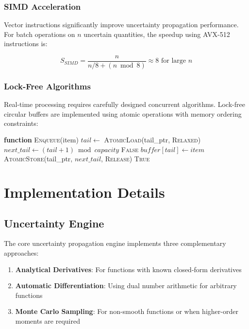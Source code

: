 \documentclass[twocolumn]{article}
\begin{document}
\subsubsection{SIMD Acceleration}

Vector instructions significantly improve uncertainty propagation performance. For batch operations on $n$ uncertain quantities, the speedup using AVX-512 instructions is:

\begin{equation}
S_{SIMD} = \frac{n}{n/8 + (n \bmod 8)} \approx 8 \text{ for large } n
\label{eq:simd_speedup}
\end{equation}

\subsubsection{Lock-Free Algorithms}

Real-time processing requires carefully designed concurrent algorithms. Lock-free circular buffers are implemented using atomic operations with memory ordering constraints:

\begin{algorithm}
\caption{Lock-Free Enqueue Operation}
\begin{algorithmic}
\STATE \textbf{function} \textsc{Enqueue}(item)
\STATE $tail \leftarrow$ \textsc{AtomicLoad}(tail\_ptr, \textsc{Relaxed})
\STATE $next\_tail \leftarrow (tail + 1) \bmod capacity$
    \RETURN \textsc{False} 
\ENDIF
\STATE $buffer[tail] \leftarrow item$
\STATE \textsc{AtomicStore}(tail\_ptr, $next\_tail$, \textsc{Release})
\RETURN \textsc{True}
\end{algorithmic}
\end{algorithm}

\section{Implementation Details}

\subsection{Uncertainty Engine}

The core uncertainty propagation engine implements three complementary approaches:

\begin{enumerate}
\item \textbf{Analytical Derivatives}: For functions with known closed-form derivatives
\item \textbf{Automatic Differentiation}: Using dual number arithmetic for arbitrary functions  
\item \textbf{Monte Carlo Sampling}: For non-smooth functions or when higher-order moments are required
\end{enumerate}
\end{document}
